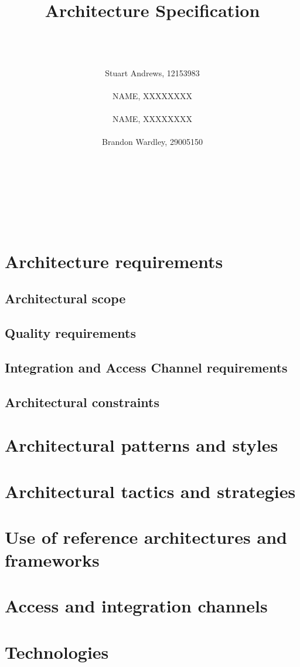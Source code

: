 \documentclass{article}
\title{Architecture Specification}
\author
{  
	\\\\\\
	Stuart Andrews, 12153983 
	\\\\
	NAME, XXXXXXXX
	\\\\
	NAME, XXXXXXXX 
	\\\\
	Brandon Wardley, 29005150 
	\\\\\\\\\\\\\\
}
\begin{document}
\maketitle
\thispagestyle{empty}
\newpage
\tableofcontents

\newpage

\section{Architecture requirements}
\subsection{Architectural scope}
\subsection{Quality requirements}
\subsection{Integration and Access Channel requirements}
\subsection{Architectural constraints}

\newpage

\section{Architectural patterns and styles}

\newpage

\section{Architectural tactics and strategies}

\newpage

\section{Use of reference architectures and frameworks}

\newpage

\section{Access and integration channels}

\newpage

\section{Technologies}
\end{document}
